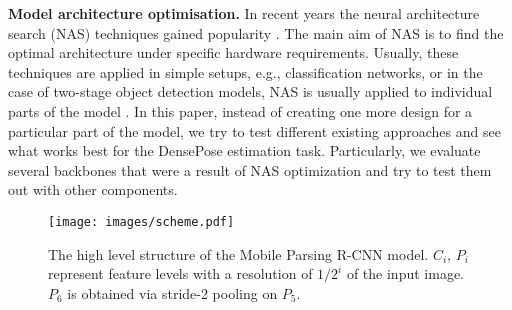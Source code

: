 \noindent \textbf{Model architecture optimisation.}
In recent years the neural architecture search (NAS) techniques gained popularity \cite{automl}. The main aim of NAS is to find the optimal architecture under specific hardware requirements. Usually, these techniques are applied in simple setups, e.g., classification networks, or in the case of two-stage object detection models, NAS is usually applied to individual parts of the model \cite{nasfpn}. In this paper, instead of creating one more design for a particular part of the model, we try to test different existing approaches and see what works best for the DensePose estimation task. Particularly, we evaluate several backbones that were a result of NAS optimization and try to test them out with other components.

\begin{figure}[!hbtp]
\centering
\texttt{[image: images/scheme.pdf]}
\caption{The high level structure of the Mobile Parsing R-CNN model. $C_i$, $P_i$ represent feature levels with a resolution of $1/2^i$ of the input image. $P_6$ is obtained via stride-2 pooling on $P_5$.}
\label{fig:scheme}
\end{figure}